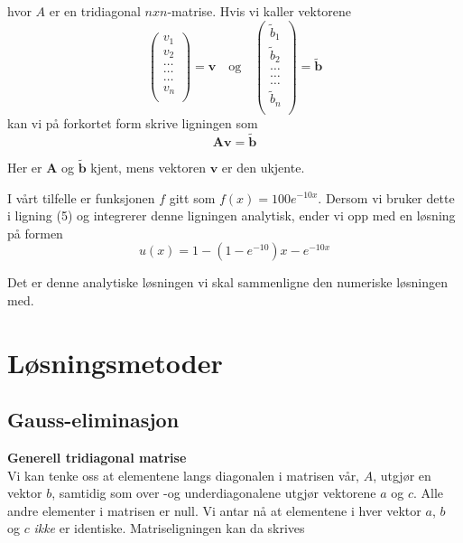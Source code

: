 \documentclass{article}
\begin{document}
hvor $A$ er en tridiagonal $nxn$-matrise. Hvis vi kaller vektorene
\begin{equation}
\left(\begin{array}{c}
                           v_1\\
                           v_2\\
                           \dots \\
                          \dots  \\
                          \dots \\
                           v_n\\
                      \end{array} \right) = \textbf{v} \quad \textrm{og} \quad 
                      \left(\begin{array}{c}
                           \tilde{b}_1\\
                           \tilde{b}_2\\
                           \dots \\
                           \dots \\
                          \dots \\
                           \tilde{b}_n\\
                      \end{array} \right) =\tilde{\textbf{b}}
\end{equation}
kan vi på forkortet form skrive ligningen som
\begin{equation}
\textbf{Av} = \tilde{\textbf{b}}
\end{equation}

Her er $\textbf{A}$ og $\tilde{\textbf{b}}$ kjent, mens vektoren $\textbf{v}$ er den ukjente.

I vårt tilfelle er funksjonen $f$ gitt som $f(x) = 100e^{-10x}$. Dersom vi bruker dette i ligning (5) og integrerer denne ligningen analytisk, ender vi opp med en løsning på formen
\begin{equation}
u(x) = 1- (1-e^{-10})x-e^{-10x}
\end{equation}

Det er denne analytiske løsningen vi skal sammenligne den numeriske løsningen med. 

\section{Løsningsmetoder}
\subsection{Gauss-eliminasjon}
\textbf{Generell tridiagonal matrise}\\
Vi kan tenke oss at elementene langs diagonalen i matrisen vår, $A$, utgjør en vektor $b$, samtidig som over -og underdiagonalene utgjør vektorene $a$ og $c$. Alle andre elementer i matrisen er null. Vi antar nå at elementene i hver vektor $a$, $b$ og $c$ \textit{ikke} er identiske. Matriseligningen kan da skrives
\end{document}
